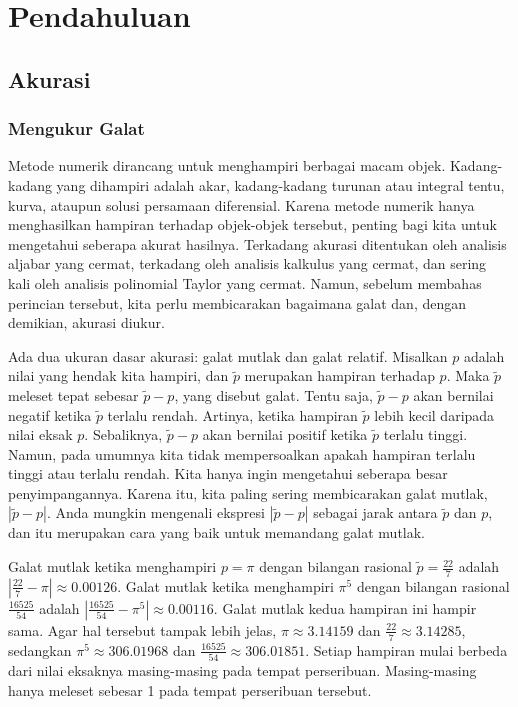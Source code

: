 
\chapter{Pendahuluan}

\section{\label{sec:Accuracy}Akurasi}

\fancyhead[LE,RO]{\thepage}
\fancyhead[RE]{\leftmark}
\fancyhead[LO]{\rightmark}

\subsection{Mengukur Galat}

Metode numerik dirancang untuk menghampiri berbagai macam objek. Kadang-kadang
yang dihampiri adalah akar, kadang-kadang turunan atau integral tentu,
kurva, ataupun solusi persamaan diferensial. Karena metode numerik
hanya menghasilkan hampiran terhadap objek-objek tersebut, penting
bagi kita untuk mengetahui seberapa akurat hasilnya. Terkadang akurasi
ditentukan oleh analisis aljabar yang cermat, terkadang oleh analisis
kalkulus yang cermat, dan sering kali oleh analisis polinomial Taylor
yang cermat. Namun, sebelum membahas perincian tersebut, kita perlu
membicarakan bagaimana galat dan, dengan demikian, akurasi diukur.

Ada dua ukuran dasar akurasi: galat mutlak
dan galat relatif. Misalkan $p$ adalah nilai
yang hendak kita hampiri, dan $\tilde{p}$ merupakan hampiran terhadap
$p$. Maka $\tilde{p}$ meleset tepat sebesar $\tilde{p}-p$, yang
disebut galat. Tentu saja, $\tilde{p}-p$ akan bernilai
negatif ketika $\tilde{p}$ terlalu rendah. Artinya, ketika hampiran
$\tilde{p}$ lebih kecil daripada nilai eksak $p$. Sebaliknya, $\tilde{p}-p$
akan bernilai positif ketika $\tilde{p}$ terlalu tinggi. Namun, pada
umumnya kita tidak mempersoalkan apakah hampiran terlalu tinggi atau
terlalu rendah. Kita hanya ingin mengetahui seberapa besar penyimpangannya.
Karena itu, kita paling sering membicarakan galat mutlak,
$|\tilde{p}-p|$. Anda mungkin mengenali ekspresi $|\tilde{p}-p|$
sebagai jarak antara $\tilde{p}$ dan $p$, dan itu merupakan cara
yang baik untuk memandang galat mutlak.

Galat mutlak ketika menghampiri $p=\pi$ dengan bilangan rasional
$\tilde{p}=\frac{22}{7}$ adalah $|\frac{22}{7}-\pi|\approx0.00126$.
Galat mutlak ketika menghampiri $\pi^{5}$ dengan bilangan rasional
$\frac{16525}{54}$ adalah $|\frac{16525}{54}-\pi^{5}|\approx0.00116$.
Galat mutlak kedua hampiran ini hampir sama. Agar hal tersebut tampak
lebih jelas, $\pi\approx3.14159$ dan $\frac{22}{7}\approx3.14285$,
sedangkan $\pi^{5}\approx306.01968$ dan $\frac{16525}{54}\approx306.01851$.
Setiap hampiran mulai berbeda dari nilai eksaknya masing-masing pada
tempat perseribuan. Masing-masing hanya meleset sebesar 1 pada tempat
perseribuan tersebut.


